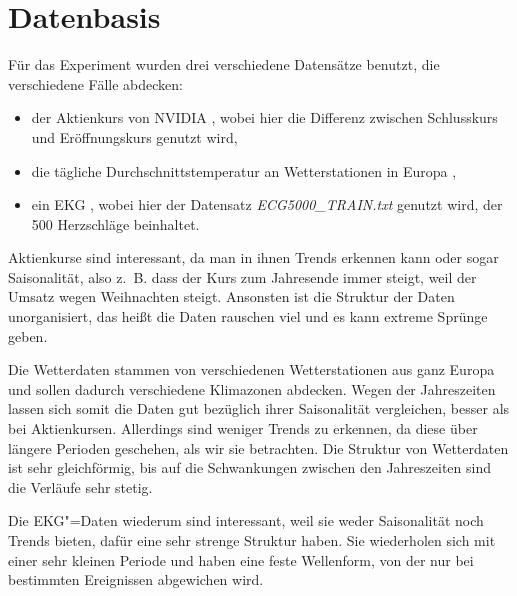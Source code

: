 \section{Datenbasis}
Für das Experiment wurden drei verschiedene Datensätze benutzt, die verschiedene Fälle abdecken: 
\begin{itemize}
    \item der Aktienkurs von NVIDIA \cite{nvidiaStock}, wobei hier die Differenz zwischen Schlusskurs und Eröffnungskurs genutzt wird,
    \item die tägliche Durchschnittstemperatur an Wetterstationen in Europa \cite{ecadWetterdaten},
    \item ein EKG \cite{ecg500}, wobei hier der Datensatz \textit{ECG5000\_TRAIN.txt} genutzt wird, der 500 Herzschläge beinhaltet.
\end{itemize}

Aktienkurse sind interessant, da man in ihnen Trends erkennen kann oder sogar Saisonalität, also z.~B. dass der Kurs zum Jahresende immer steigt, weil der Umsatz wegen Weihnachten steigt. Ansonsten ist die Struktur der Daten unorganisiert, das heißt die Daten rauschen viel und es kann extreme Sprünge geben.

Die Wetterdaten stammen von verschiedenen Wetterstationen aus ganz Europa und sollen dadurch verschiedene Klimazonen abdecken. Wegen der Jahreszeiten lassen sich somit die Daten gut bezüglich ihrer Saisonalität vergleichen, besser als bei Aktienkursen. Allerdings sind weniger Trends zu erkennen, da diese über längere Perioden geschehen, als wir sie betrachten. Die Struktur von Wetterdaten ist sehr gleichförmig, bis auf die Schwankungen zwischen den Jahreszeiten sind die Verläufe sehr stetig.

Die EKG"=Daten wiederum sind interessant, weil sie weder Saisonalität noch Trends bieten, dafür eine sehr strenge Struktur haben. Sie wiederholen sich mit einer sehr kleinen Periode und haben eine feste Wellenform, von der nur bei bestimmten Ereignissen abgewichen wird.